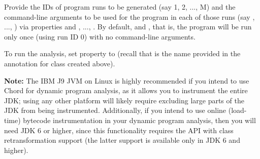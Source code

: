 Provide the IDs of program runs to be generated (say 1, 2, ..., M) and the command-line arguments to be
used for the program in each of those runs (say , ..., ) via properties
 and , ..., .
By default,  and , that is, the program will be run only
once (using run ID 0) with no command-line arguments.

To run the analysis, set property  to
 (recall that  is the name provided
in the  annotation for class  created
above).

{\bf Note:} The IBM J9 JVM on Linux is highly recommended if you intend to use Chord for
dynamic program analysis, as it allows you to instrument the entire JDK; using any other
platform will likely require excluding large parts of the JDK from being instrumented.
Additionally, if you intend to use online (load-time) bytecode instrumentation in
your dynamic program analysis, then you will need JDK 6 or higher, since this functionality
requires the  API with class retransformation support (the latter
support is available only in JDK 6 and higher).

